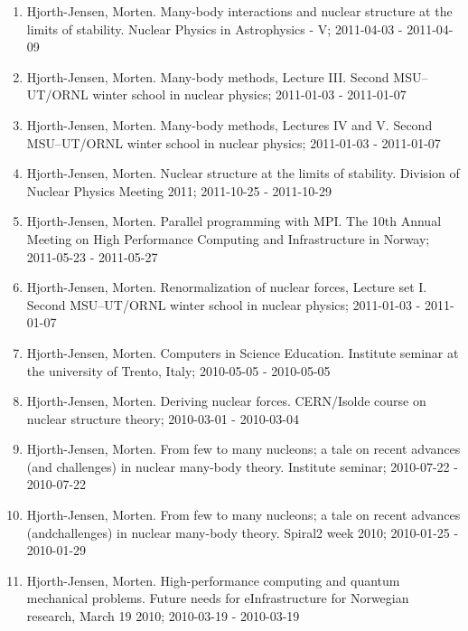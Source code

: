 \documentclass[%
oneside,                 %
final,                   %
10pt]{article}
\begin{document}
\begin{enumerate}
\item Hjorth-Jensen, Morten.  Many-body interactions and nuclear structure at the limits of stability. Nuclear Physics in Astrophysics - V; 2011-04-03 - 2011-04-09

\item Hjorth-Jensen, Morten.  Many-body methods, Lecture III. Second MSU--UT/ORNL winter school in nuclear physics; 2011-01-03 - 2011-01-07

\item Hjorth-Jensen, Morten.  Many-body methods, Lectures IV and V. Second MSU--UT/ORNL winter school in nuclear physics; 2011-01-03 - 2011-01-07

\item Hjorth-Jensen, Morten.  Nuclear structure at the limits of stability. Division of Nuclear Physics Meeting 2011; 2011-10-25 - 2011-10-29

\item Hjorth-Jensen, Morten.  Parallel programming with MPI. The 10th Annual Meeting on High Performance Computing and Infrastructure in Norway; 2011-05-23 - 2011-05-27

\item Hjorth-Jensen, Morten.  Renormalization of nuclear forces, Lecture set I. Second MSU--UT/ORNL winter school in nuclear physics; 2011-01-03 - 2011-01-07

\item Hjorth-Jensen, Morten.  Computers in Science Education. Institute seminar at the university of Trento, Italy; 2010-05-05 - 2010-05-05

\item Hjorth-Jensen, Morten.  Deriving nuclear forces. CERN/Isolde course on nuclear structure theory; 2010-03-01 - 2010-03-04

\item Hjorth-Jensen, Morten.  From few to many nucleons; a tale on recent advances (and challenges) in nuclear many-body theory. Institute seminar; 2010-07-22 - 2010-07-22

\item Hjorth-Jensen, Morten.  From few to many nucleons; a tale on recent advances (andchallenges) in nuclear many-body theory. Spiral2 week 2010; 2010-01-25 - 2010-01-29

\item Hjorth-Jensen, Morten.  High-performance computing and quantum mechanical problems. Future needs for eInfrastructure for Norwegian research, March 19 2010; 2010-03-19 - 2010-03-19


\end{enumerate}
\end{document}

